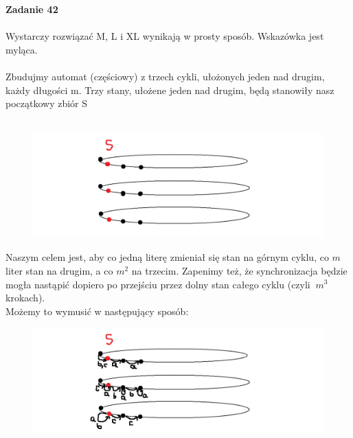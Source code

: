 \documentclass[a4paper,11pt]{article}
\begin{document}
\textbf{Zadanie 42} \\ \\
Wystarczy rozwiązać M, L i XL wynikają w prosty sposób. Wskazówka jest myląca. \\ \\

Zbudujmy automat (częściowy) z trzech cykli, ułożonych jeden nad drugim, każdy długości m. Trzy stany, ułożene jeden nad
drugim, będą stanowiły nasz początkowy zbiór S \\ \\

\begin{figure}[h!]
  \centerline{%
    \includegraphics[width=18cm]{zad42.png}%
  }%
\end{figure}

Naszym celem jest, aby co jedną literę zmieniał się stan na górnym cyklu, co $m$ liter stan na drugim, a co $m^2$ na trzecim.
Zapenimy też, że synchronizacja będzie mogła nastąpić dopiero po przejściu przez dolny stan całego cyklu (czyli $~m^3$ krokach). \\
Możemy to wymusić w następujący sposób: \\

\begin{figure}[h!]
  \centerline{%
    \includegraphics[width=18cm]{zad42_2.png}%
  }%
\end{figure}
\end{document}
